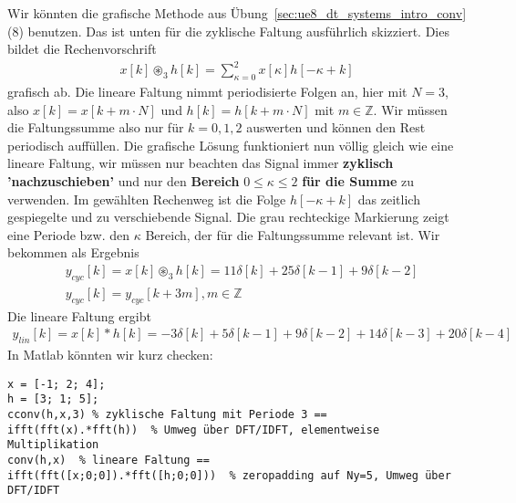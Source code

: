 \begin{Ansatz}
Wir könnten die grafische Methode aus Übung~\ref{sec:ue8_dt_systems_intro_conv} (8) benutzen.
Das ist unten
für die zyklische Faltung ausführlich skizziert.
Dies bildet die Rechenvorschrift
\begin{align}
x[k] \circledast_3 h[k] = \sum_{\kappa=0}^{2} x[\kappa] h[-\kappa + k]
\end{align}
grafisch ab.
Die lineare Faltung nimmt periodisierte Folgen an, hier mit $N=3$, also
$x[k] = x[k+m \cdot N]$ und $h[k] = h[k+m \cdot N]$ mit $m\in\mathbb{Z}$.
Wir müssen die Faltungssumme also nur für $k=0,1,2$ auswerten und können
den Rest periodisch auffüllen.
%
Die grafische Lösung funktioniert nun völlig gleich wie eine lineare Faltung,
wir müssen nur beachten das Signal immer \textbf{zyklisch 'nachzuschieben'} und nur den
\textbf{Bereich} $0 \leq \kappa \leq 2$ \textbf{für die Summe} zu verwenden.
%
Im gewählten Rechenweg ist die Folge $h[-\kappa+k]$ das zeitlich gespiegelte und zu
verschiebende Signal.
%
Die grau rechteckige Markierung zeigt eine Periode bzw. den $\kappa$ Bereich,
der für die Faltungssumme relevant ist.
%
Wir bekommen als Ergebnis
\begin{align}
&y_{cyc}[k] = x[k] \circledast_3 h[k] = 11\delta[k] + 25\delta[k-1] + 9\delta[k-2]\nonumber\\
&y_{cyc}[k] = y_{cyc}[k + 3 m], m\in\mathbb{Z}
\end{align}
%
Die lineare Faltung ergibt
\begin{align}
y_{lin}[k] = x[k] \ast h[k] = -3\delta[k] + 5\delta[k-1] + 9\delta[k-2] + 14\delta[k-3] + 20\delta[k-4]
\end{align}
%
In Matlab könnten wir kurz checken:
\begin{verbatim}
x = [-1; 2; 4];
h = [3; 1; 5];
cconv(h,x,3) % zyklische Faltung mit Periode 3 ==
ifft(fft(x).*fft(h))  % Umweg über DFT/IDFT, elementweise Multiplikation
conv(h,x)  % lineare Faltung ==
ifft(fft([x;0;0]).*fft([h;0;0]))  % zeropadding auf Ny=5, Umweg über DFT/IDFT
\end{verbatim}


\end{Ansatz}

